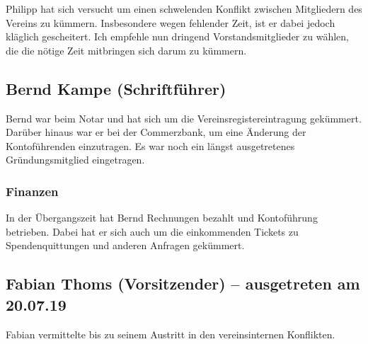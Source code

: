 \documentclass[ngerman]{scrartcl}
\begin{document}
Philipp hat sich versucht um einen schwelenden Konflikt zwischen Mitgliedern
des Vereins zu kümmern. Insbesondere wegen fehlender Zeit, ist er dabei jedoch
kläglich gescheitert. Ich empfehle nun dringend Vorstandsmitglieder zu wählen, die
die nötige Zeit mitbringen sich darum zu kümmern.

\subsection{Bernd Kampe (Schriftführer)}

Bernd war beim Notar und hat sich um die Vereinsregistereintragung gekümmert. Darüber hinaus war er bei der Commerzbank, um eine Änderung der Kontoführenden einzutragen. Es war noch ein längst ausgetretenes Gründungsmitglied eingetragen.

\subsubsection{Finanzen}

In der Übergangszeit hat Bernd Rechnungen bezahlt und Kontoführung betrieben. Dabei hat er sich auch um die einkommenden Tickets zu Spendenquittungen und anderen Anfragen gekümmert.

\subsection{Fabian Thoms (Vorsitzender) -- ausgetreten am 20.07.19}

Fabian vermittelte bis zu seinem Austritt in den vereinsinternen Konflikten.
\end{document}
